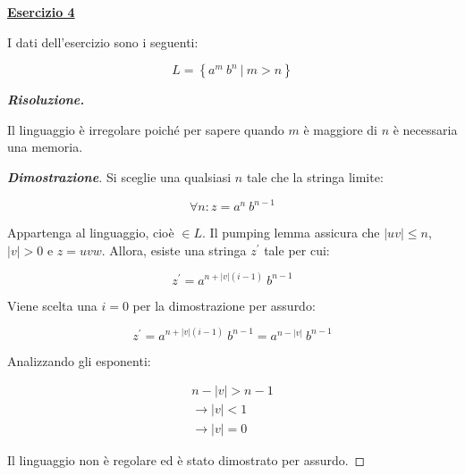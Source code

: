 \documentclass[a4paper]{article}
\begin{document}
	\noindent
	\textcolor{Red3}{\textbf{\underline{Esercizio 4}}}\newline
	
	\noindent
	I dati dell'esercizio sono i seguenti:
	
	\begin{equation*}
		L = \left\{a^{m} \: b^{n} \: \left| \: m > n \right.\right\}
	\end{equation*}\newline
	
	\noindent
	\textcolor{Green4}{\textbf{\emph{Risoluzione.}}}\newline
	
	\noindent
	Il linguaggio è irregolare poiché per sapere quando $m$ è maggiore di $n$ è necessaria una memoria.
	
	\begin{proof}[\textcolor{Blue3}{\textbf{Dimostrazione}}]
		Si sceglie una qualsiasi $n$ tale che la stringa limite:
		
		\begin{equation*}
			\forall n : z = a^{n} \: b^{n-1}
		\end{equation*}
		
		\noindent
		Appartenga al linguaggio, cioè $\in L$. Il pumping lemma assicura che $|uv| \le n$, $|v| > 0$ e $z = uvw$. Allora, esiste una stringa $z^{'}$ tale per cui:
		
		\begin{equation*}
			z^{'} = a^{n + |v|\left(i-1\right)} \: b^{n-1}
		\end{equation*}
	
		\noindent
		Viene scelta una $i = 0$ per la dimostrazione per assurdo:
		
		\begin{equation*}
			z^{'} = a^{n + |v|\left(i-1\right)} \: b^{n-1} = a^{n - |v|} \: b^{n-1}
		\end{equation*}
	
		\noindent
		Analizzando gli esponenti:
		
		\begin{gather*}
			n - |v| > n - 1 \\
			\rightarrow |v| < 1 \\
			\rightarrow |v| = 0
		\end{gather*}
	
		\noindent
		Il linguaggio non è regolare ed è stato dimostrato per assurdo.
	\end{proof}

	\newpage
	
\end{document}
